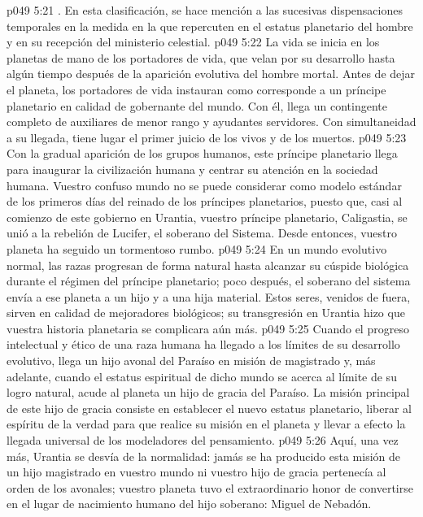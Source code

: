 \vs p049 5:21 . En esta clasificación, se hace mención a las sucesivas dispensaciones temporales en la medida en la que repercuten en el estatus planetario del hombre y en su recepción del ministerio celestial.
\vs p049 5:22 La vida se inicia en los planetas de mano de los portadores de vida, que velan por su desarrollo hasta algún tiempo después de la aparición evolutiva del hombre mortal. Antes de dejar el planeta, los portadores de vida instauran como corresponde a un príncipe planetario en calidad de gobernante del mundo. Con él, llega un contingente completo de auxiliares de menor rango y ayudantes servidores. Con simultaneidad a su llegada, tiene lugar el primer juicio de los vivos y de los muertos.
\vs p049 5:23 Con la gradual aparición de los grupos humanos, este príncipe planetario llega para inaugurar la civilización humana y centrar su atención en la sociedad humana. Vuestro confuso mundo no se puede considerar como modelo estándar de los primeros días del reinado de los príncipes planetarios, puesto que, casi al comienzo de este gobierno en Urantia, vuestro príncipe planetario, Caligastia, se unió a la rebelión de Lucifer, el soberano del Sistema. Desde entonces, vuestro planeta ha seguido un tormentoso rumbo.
\vs p049 5:24 En un mundo evolutivo normal, las razas progresan de forma natural hasta alcanzar su cúspide biológica durante el régimen del príncipe planetario; poco después, el soberano del sistema envía a ese planeta a un hijo y a una hija material. Estos seres, venidos de fuera, sirven en calidad de mejoradores biológicos; su transgresión en Urantia hizo que vuestra historia planetaria se complicara aún más.
\vs p049 5:25 Cuando el progreso intelectual y ético de una raza humana ha llegado a los límites de su desarrollo evolutivo, llega un hijo avonal del Paraíso en misión de magistrado y, más adelante, cuando el estatus espiritual de dicho mundo se acerca al límite de su logro natural, acude al planeta un hijo de gracia del Paraíso. La misión principal de este hijo de gracia consiste en establecer el nuevo estatus planetario, liberar al espíritu de la verdad para que realice su misión en el planeta y llevar a efecto la llegada universal de los modeladores del pensamiento.
\vs p049 5:26 Aquí, una vez más, Urantia se desvía de la normalidad: jamás se ha producido esta misión de un hijo magistrado en vuestro mundo ni vuestro hijo de gracia pertenecía al orden de los avonales; vuestro planeta tuvo el extraordinario honor de convertirse en el lugar de nacimiento humano del hijo soberano: Miguel de Nebadón.
